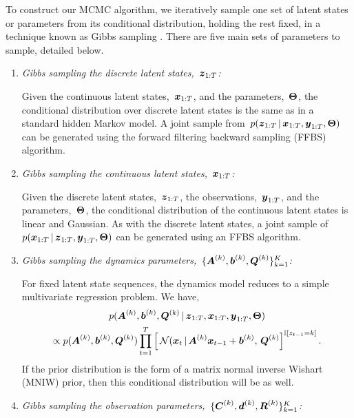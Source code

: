 \documentclass{article}
\begin{document}
To construct our MCMC algorithm, we iteratively sample one set of 
latent states or parameters from its conditional distribution, holding 
the rest fixed, in a technique known as Gibbs sampling . 
There are five main sets of parameters to sample, detailed below.
\begin{enumerate}
  \item \textit{Gibbs sampling the discrete latent states,~$\boldsymbol{z}_{1:T}$:}
    
    Given the continuous latent states,~$\boldsymbol{x}_{1:T}$, and the
    parameters,~$\boldsymbol{\Theta}$, the conditional distribution over discrete
    latent states is the same as in a standard hidden Markov model. A
    joint sample from~$p(\boldsymbol{z}_{1:T} \,|\, \boldsymbol{x}_{1:T}, \boldsymbol{y}_{1:T},
    \boldsymbol{\Theta})$ can be generated using the forward filtering backward
    sampling (FFBS) algorithm.

  \item \textit{Gibbs sampling the continuous latent states,~$\boldsymbol{x}_{1:T}$:}
    
    Given the discrete latent states,~$\boldsymbol{z}_{1:T}$, the observations,~$\boldsymbol{y}_{1:T}$,
    and the parameters,~$\boldsymbol{\Theta}$, the conditional distribution of the 
    continuous latent states is linear and Gaussian. As with the discrete
    latent states, a joint sample of~$p(\boldsymbol{x}_{1:T} \,|\, \boldsymbol{z}_{1:T}, \boldsymbol{y}_{1:T}, \boldsymbol{\Theta})$
    can be generated using an FFBS algorithm.

  \item \textit{Gibbs sampling the dynamics parameters,~$\{\boldsymbol{A}^{(k)}, \boldsymbol{b}^{(k)}, \boldsymbol{Q}^{(k)}\}_{k=1}^K$:}
    
    For fixed latent state sequences, the dynamics model reduces to a simple 
    multivariate regression problem. We have,
    \begin{multline}
      p(\boldsymbol{A}^{(k)}, \boldsymbol{b}^{(k)}, \boldsymbol{Q}^{(k)}  \,|\, \boldsymbol{z}_{1:T}, \boldsymbol{x}_{1:T}, \boldsymbol{y}_{1:T}, \boldsymbol{\Theta})
      \\ 
      \propto
      p(\boldsymbol{A}^{(k)}, \boldsymbol{b}^{(k)}, \boldsymbol{Q}^{(k)})
      \prod_{t=1}^T \left[ \,
        \mathcal{N}(\boldsymbol{x}_{t} \,|\, \boldsymbol{A}^{(k)} \boldsymbol{x}_{t-1} + \boldsymbol{b}^{(k)},\, \boldsymbol{Q}^{(k)} \right]^{\mathbb{I}[z_{t-1}=k]}.
    \end{multline}
    If the prior distribution is the form of a matrix normal inverse Wishart (MNIW) prior, 
    then this conditional distribution will be as well. 

  \item \textit{Gibbs sampling the observation parameters,~$\{\boldsymbol{C}^{(k)}, \boldsymbol{d}^{(k)}, \boldsymbol{R}^{(k)}\}_{k=1}^K$:}
    

\end{enumerate}
\end{document}
